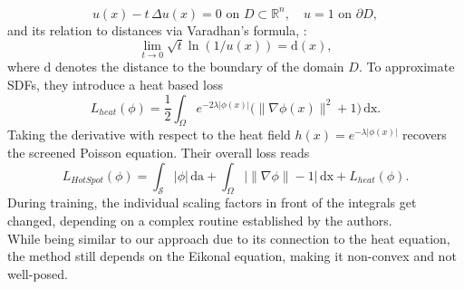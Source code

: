 \documentclass[12pt,openany]{book}
\newcommand{\R}{\mathbb{R}}
\def\S{\mathcal{S}}
\theoremstyle{plainnormal}
\theoremstyle{remark}
\begin{document}
$$u(x) - t\,\Delta u(x) = 0 \text{ on } D\subset \R^n, \quad u = 1 \text{ on } \partial D,$$
and its relation to distances via Varadhan's formula, \cite{varadhan}:
$$
\lim_{t\rightarrow0} \sqrt{t}\ln(1/u(x)) = \mathrm{d}(x),
$$ where $\mathrm{d}$ denotes the distance to the boundary of the domain $D$. To approximate SDFs, they introduce a heat based loss $$L_{heat}(\phi) = \frac{1}{2}\int_\Omega e^{-2\lambda |\phi(x)|}\big(\|\nabla \phi(x)\|^2 + 1\big) \,\mathrm{dx}.$$ Taking the derivative with respect to the heat field $h(x) = e^{-\lambda|\phi(x)|}$ recovers the screened Poisson equation. Their overall loss reads $$L_{HotSpot}(\phi) = \int_\S |\phi|\,\mathrm{da}  + \int_\Omega \big|\|\nabla \phi\| - 1\big|\,\mathrm{dx} + L_{heat}(\phi).$$
During training, the individual scaling factors in front of the integrals get changed, depending on a complex routine established by the authors.\\ While being similar to our approach due to its connection to the heat equation, the method still depends on the Eikonal equation, making it non-convex and not well-posed.%
\end{document}
